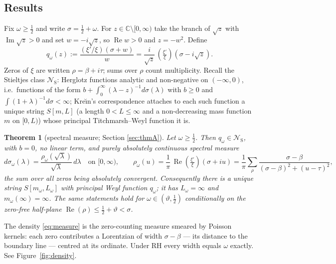 \documentclass[11pt,reqno]{amsart}
\theoremstyle{plain}
\newtheorem{theorem}{Theorem}[section]
\theoremstyle{definition}
\newcommand{\C}{\mathbb{C}}
\newcommand{\Rp}{\operatorname{Re}}
\newcommand{\Ip}{\operatorname{Im}}
\newcommand{\lxi}[1]{\left(\tfrac{\xi'}{\xi}\right)\!#1}
\newcommand{\NS}{\mathcal N_{\mathrm S}}
\begin{document}
\subsection{Results}
Fix $\omega\ge\tfrac12$ and write $\sigma=\tfrac12+\omega$. For $z\in\C\setminus[0,\infty)$
take the branch of $\sqrt z$ with $\Ip\sqrt z>0$ and set $w=-i\sqrt z$, so $\Rp w>0$ and
$z=-w^2$. Define
\begin{equation}\label{eq:qdef}
  q_\omega(z):=\frac{(\xi'/\xi)(\sigma+w)}{w}
  =\frac{i}{\sqrt z}\,\lxi{\left(\sigma-i\sqrt z\right)} .
\end{equation}
Zeros of $\xi$ are written $\rho=\beta+i\tau$; sums over $\rho$ count multiplicity. Recall the
Stieltjes class $\NS$: Herglotz functions analytic and non-negative on $(-\infty,0)$, i.e.\
functions of the form $b+\int_0^\infty(\lambda-z)^{-1}d\sigma(\lambda)$ with $b\ge0$ and
$\int(1+\lambda)^{-1}d\sigma<\infty$; Kre\u\i n's correspondence \cite{Krein1952,KacKrein}
attaches to each such function a unique string $S[m,L]$ (a length $0<L\le\infty$ and a
non-decreasing mass function $m$ on $[0,L)$) whose principal Titchmarsh--Weyl function it is.

\begin{theorem}[spectral measure; Section \ref{sec:thmA}]\label{thm:A}
Let $\omega\ge\tfrac12$. Then $q_\omega\in\NS$, with $b=0$, no linear term, and purely
absolutely continuous spectral measure
\begin{equation}\label{eq:measure}
  d\sigma_\omega(\lambda)=\frac{\rho_\omega(\sqrt\lambda)}{\sqrt\lambda}\,d\lambda
  \quad\text{on }[0,\infty),
  \qquad
  \rho_\omega(u)=\frac1\pi\,\Rp\lxi{(\sigma+iu)}
  =\frac1\pi\sum_\rho\frac{\sigma-\beta}{(\sigma-\beta)^2+(u-\tau)^2},
\end{equation}
the sum over all zeros being absolutely convergent. Consequently there is a unique string
$S[m_\omega,L_\omega]$ with principal Weyl function $q_\omega$; it has $L_\omega=\infty$ and
$m_\omega(\infty)=\infty$. The same statements hold for $\omega\in(\vartheta,\tfrac12)$
conditionally on the zero-free half-plane $\Rp(\rho)\le\tfrac12+\vartheta<\sigma$.
\end{theorem}

The density \eqref{eq:measure} is the zero-counting measure smeared by Poisson kernels: each
zero contributes a Lorentzian of width $\sigma-\beta$ --- its distance to the boundary line ---
centred at its ordinate. Under RH every width equals $\omega$ exactly. See
Figure~\ref{fig:density}.
\end{document}
